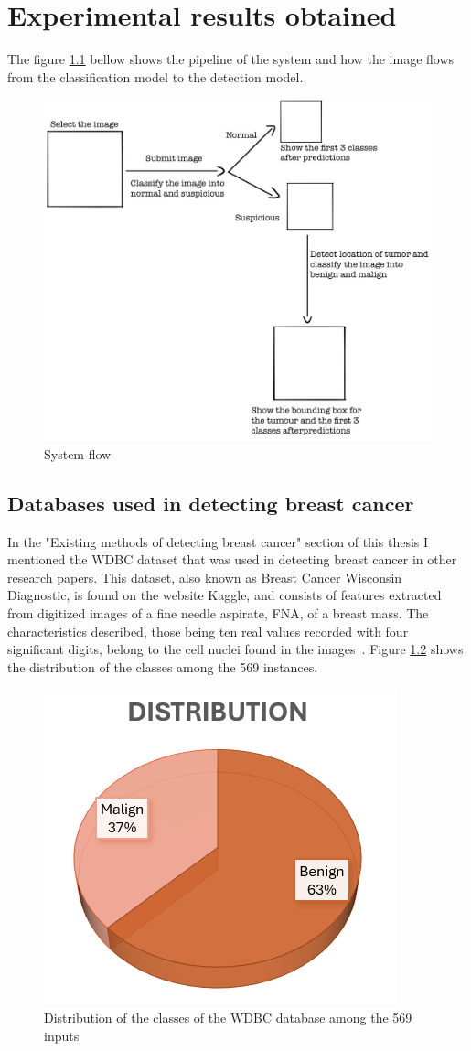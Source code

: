 \chapter{Experimental results obtained}
\label{chap:ch4}

The figure \ref{fig:fig33} bellow shows the pipeline of the system and how the image flows from the classification model to the detection model.

\begin{figure}[H]
    \centering
    \includegraphics[width=0.7\linewidth]{figures/Figure38.png}
    \caption{System flow}
    \label{fig:fig33}
\end{figure}

\section{Databases used in detecting breast cancer}

In the "Existing methods of detecting breast cancer" section of this thesis
I mentioned the WDBC dataset that was used in detecting breast cancer in other research papers. This dataset, also known as Breast Cancer Wisconsin Diagnostic, is found on the website Kaggle, and consists of features extracted from digitized images of a fine needle aspirate, FNA, of a breast mass. The characteristics described, those being ten real values recorded with four significant digits, belong to the cell nuclei found in the images~\cite{link9}. 
Figure \ref{fig:fig28} shows the distribution of the classes among the 569 instances.

\begin{figure}[ht!]
    \centering
    \includegraphics[width=0.5\linewidth]{figures/Figure34.png}
    \caption{Distribution of the classes of the WDBC database among the 569 inputs}
    \label{fig:fig28}
\end{figure}

